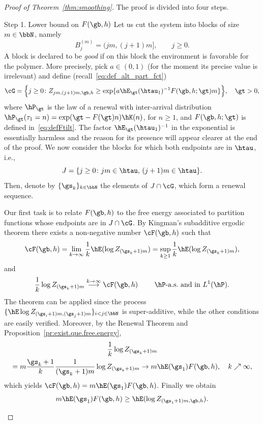 \begin{proof}[Proof of Theorem~\ref{thm:smoothing}]
The proof is divided into four steps.

\begin{step}{Step 1. Lower bound on $F(\gb,h)$}
Let us cut the system into blocks of size $m \in \bbN$, namely
\begin{equation}
B_j^{(m)} = (jm,(j+1)m], \qquad j \geq 0.
\end{equation}
A block is declared to be \emph{good} if on this block the environment is favorable for the polymer. More precisely, pick $a \in (0,1)$ (for the moment its precise value is irrelevant) and define (recall~\eqref{eq:def_alt_part_fct})
\begin{equation}\label{eq:defgoodblock}
\cG = \Big\{ j \geq 0 \colon Z_{jm,(j+1)m,\gb,h} \geq \exp \{a \hE_\gt(\htau_1)^{-1} F(\gb,h;\gt) m\} \Big\}, \quad \gt > 0,
\end{equation}
where $\hP_{\gt}$ is the law of a renewal with inter-arrival distribution $\hP_\gt(\tau_1 = n) = \exp(\gt - F(\gt) n) \hK(n)$, for $n \geq 1$, and $F(\gb,h;\gt)$ is defined in~\eqref{eq:defFtilt}. The factor $\hE_\gt(\htau_1)^{-1}$ in the exponential is essentially harmless and the reason for its presence will appear clearer at the end of the proof. We now consider the blocks for which both endpoints are in $\htau$, i.e.,
\begin{equation}
J = \{ j \geq 0 \colon j m \in \htau, \, (j + 1) m \in \htau\}.
\end{equation}
Then, denote by $\{\gs_k\}_{k \in \bbN}$ the elements of $J \cap \cG$, which form a renewal sequence.

Our first task is to relate $F(\gb,h)$ to the free energy associated to partition functions whose endpoints are in $J \cap \cG$. By Kingman's subadditive ergodic theorem there exists a non-negative number $\cF(\gb,h)$ such that
\begin{equation}
\cF(\gb,h) = \lim_{k\to\infty} \frac{1}{k} \hE(\log Z_{(\gs_k + 1) m}) = \sup_{k\geq1} \frac{1}{k} \hE(\log Z_{(\gs_k + 1) m}),
\end{equation}
and
\begin{equation}
\frac{1}{k} \log Z_{(\gs_k + 1) m} \stackrel{k\to\infty}{\longrightarrow} \cF(\gb,h) \qquad \text{ $\hP$-a.s.\ and in $L^1(\hP)$.}
\end{equation}
The theorem can be applied since the process $\{\hE \log Z_{(\gs_i + 1) m, (\gs_j + 1)m} \}_{i<j \in \bbN}$ is super-additive, while the other conditions are easily verified. Moreover, by the Renewal Theorem and Proposition~\ref{pr:exist.que.free.energy},
\begin{multline}
\frac{1}{k} \log Z_{(\gs_k + 1) m}\\
= m \frac{\gs_k + 1}{k} \frac{1}{(\gs_k + 1) m} \log Z_{(\gs_k + 1) m} \rightarrow m \hE(\gs_1) F(\gb,h), \quad k \nearrow \infty,
\end{multline}
which yields $\cF(\gb,h) = m \hE(\gs_1) F(\gb,h)$. Finally we obtain
\begin{equation}\label{eq:sm1}
m \hE(\gs_1) F(\gb,h) \geq \hE(\log Z_{(\gs_1 + 1) m,\gb,h}).
\end{equation}
\end{step}


\end{proof}
